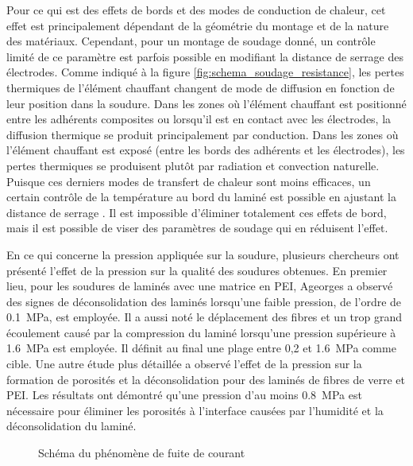 Pour ce qui est des effets de bords et des modes de conduction de chaleur, cet effet est principalement dépendant de la géométrie du montage et de la nature des matériaux. 
Cependant, pour un montage de soudage donné, un contrôle limité de ce paramètre est parfois possible en modifiant la distance de serrage des électrodes. 
Comme indiqué à la figure \ref{fig:schema_soudage_resistance}, les pertes thermiques de l'élément chauffant changent de mode de diffusion en fonction de leur position dans la soudure. 
Dans les zones où l'élément chauffant est positionné entre les adhérents composites ou lorsqu'il est en contact avec les électrodes, la diffusion thermique se produit principalement par conduction. 
Dans les zones où l'élément chauffant est exposé (entre les bords des adhérents et les électrodes), les pertes thermiques se produisent plutôt par radiation et convection naturelle. 
Puisque ces derniers modes de transfert de chaleur sont moins efficaces, un certain contrôle de la température au bord du laminé est possible en ajustant la distance de serrage \cite{Talbot2013}. 
Il est impossible d'éliminer totalement ces effets de bord, mais il est possible de viser des paramètres de soudage qui en réduisent l'effet. 

En ce qui concerne la pression appliquée sur la soudure, plusieurs chercheurs ont présenté l'effet de la pression sur la qualité des soudures obtenues. 
En premier lieu, pour les soudures de laminés avec une matrice en PEI, Ageorges \cite{Ageorges2000a} a observé des signes de déconsolidation des laminés lorsqu'une faible pression, de l'ordre de \SI[locale=FR]{0.1}{\mega\pascal}, est employée.
Il a aussi noté le déplacement des fibres et un trop grand écoulement causé par la compression du laminé lorsqu'une pression supérieure à \SI[locale=FR]{1.6}{\mega\pascal} est employée. 
Il définit au final une plage entre 0,2 et \SI[locale=FR]{1.6}{\mega\pascal} comme cible. 
Une autre étude plus détaillée \cite{Shi2017} a observé l'effet de la pression sur la formation de porosités et la déconsolidation pour des laminés de fibres de verre et PEI. 
Les résultats ont démontré qu'une pression d'au moins \SI[locale=FR]{0.8}{\mega\pascal} est nécessaire pour éliminer les porosités à l'interface causées par l'humidité et la déconsolidation du laminé. 

\begin{figure}[h]
	\centering
	
	\caption{Schéma du phénomène de fuite de courant}
	\label{fig:schema_fuite_de_courant}
\end{figure}


